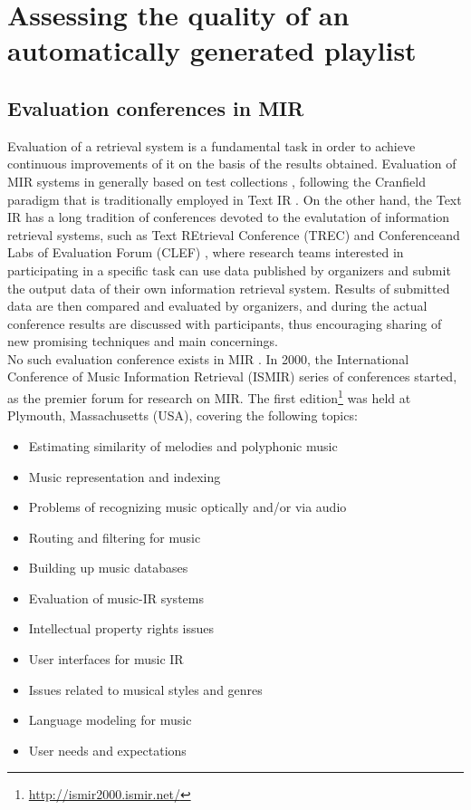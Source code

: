 \chapter{Assessing the quality of an automatically generated playlist} 

\label{Chapter3} 


\section{Evaluation conferences in MIR}

Evaluation of a retrieval system is a fundamental task in order to achieve continuous improvements of it on the basis of the results obtained. Evaluation of MIR systems in generally based on test collections \cite{sanderson10}, following the Cranfield paradigm that is traditionally employed in Text IR \cite{harman11} \cite{gomez14}. On the other hand, the Text IR has a long tradition of conferences devoted to the evalutation of information retrieval systems, such as Text REtrieval Conference (TREC) \cite{trec05} and Conferenceand Labs of Evaluation Forum (CLEF) \cite{clef00}, where research teams interested in participating in a specific task can use data published by organizers and submit the output data of their own information retrieval system. Results of submitted data are then compared and evaluated by organizers, and during the actual conference results are discussed with participants, thus encouraging sharing of new promising techniques and main concernings. \\
No such evaluation conference exists in MIR \cite{gomez14}. In 2000, the International Conference of Music Information Retrieval (ISMIR) series of conferences started, as the premier forum for research on MIR. The first edition\footnote{\url{http://ismir2000.ismir.net/}} was held at Plymouth, Massachusetts (USA), covering the following topics: 
\begin{itemize}
\item Estimating similarity of melodies and polyphonic music
\item Music representation and indexing
\item Problems of recognizing music optically and/or via audio
\item Routing and filtering for music
\item Building up music databases
\item Evaluation of music-IR systems
\item Intellectual property rights issues
\item User interfaces for music IR
\item Issues related to musical styles and genres
\item Language modeling for music
\item User needs and expectations
\end{itemize}

